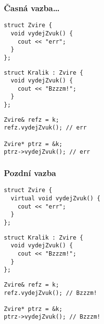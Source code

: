 \begin{frame}[fragile]
\frametitle{Časná vazba\ldots}

\begin{yesblock}
\begin{twocols}
\begin{lstlisting}
struct Zvire {
  void vydejZvuk() {
    cout << "err";
  }
};
\end{lstlisting}

\twocolssep

\begin{lstlisting}
struct Kralik : Zvire {
  void vydejZvuk() {
    cout << "Bzzzm!";
  }
};
\end{lstlisting}
\end{twocols}
\end{yesblock}

\begin{noblock}
\begin{lstlisting}
Zvire& refz = k;
refz.vydejZvuk(); // err

Zvire* ptrz = &k;
ptrz->vydejZvuk(); // err
\end{lstlisting}
\end{noblock}
\end{frame}






\begin{frame}[fragile]
\frametitle{Pozdní vazba}

\begin{yesblock}
\begin{twocols}
\begin{lstlisting}
struct Zvire {
  virtual void vydejZvuk() {
    cout << "err";
  }
};
\end{lstlisting}

\twocolssep

\begin{lstlisting}
struct Kralik : Zvire {
  void vydejZvuk() {
    cout << "Bzzzm!";
  }
};
\end{lstlisting}
\end{twocols}
\end{yesblock}

\begin{yesblock}
\begin{lstlisting}
Zvire& refz = k;
refz.vydejZvuk(); // Bzzzm!

Zvire* ptrz = &k;
ptrz->vydejZvuk(); // Bzzzm!
\end{lstlisting}
\end{yesblock}
\end{frame}






